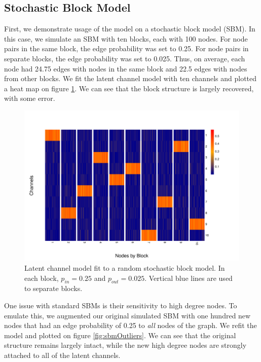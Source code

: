 \documentclass[11pt]{amsart}
\begin{document}
\subsection{Stochastic Block Model}

First, we demonstrate usage of the model on a stochastic block model (SBM). In this case, we simulate an SBM 
with ten blocks, each with 100 nodes. For node pairs in the same block, the edge probability was set to 0.25. 
For node pairs in separate blocks, the edge probability was set to 0.025. Thus, on average, each node had 24.75 edges with 
nodes in the same block and 22.5 edges with nodes from other blocks. We fit the latent channel model with ten channels and plotted a heat map on 
figure \ref{fig:sbm}. We can see that the block structure is largely recovered, with some error. 

\begin{figure}
\includegraphics[width = 12cm]{baseSBM.pdf}
\caption{Latent channel model fit to a random stochastic block model. In each block, $p_{in} = 0.25$ and $p_{out} = 0.025$.
Vertical blue lines are used to separate blocks.}
\label{fig:sbm}
\end{figure}

One issue with standard SBMs is their sensitivity to high degree nodes. 
To emulate this, we augmented our original simulated SBM with one hundred new nodes that had an edge probability of 0.25 
to \emph{all} nodes of the graph. We refit the model and plotted on figure \ref{fig:sbmOutliers}. 
We can see that the original structure remains largely intact, 
while the new high degree nodes are strongly attached to all of the latent channels. 
\end{document}
